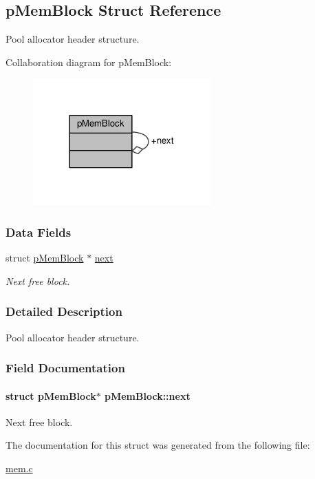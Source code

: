 \hypertarget{structpMemBlock}{\subsection{p\-Mem\-Block Struct Reference}
\label{structpMemBlock}
}


Pool allocator header structure.  




Collaboration diagram for p\-Mem\-Block\-:\nopagebreak
\begin{figure}[H]
\begin{center}
\leavevmode
\includegraphics[width=194pt]{structpMemBlock__coll__graph}
\end{center}
\end{figure}
\subsubsection*{Data Fields}
\begin{DoxyCompactItemize}
\item 
struct \hyperlink{structpMemBlock}{p\-Mem\-Block} $\ast$ \hyperlink{structpMemBlock_af04fa2bbd0fd3da6baf2ac08ce54455e}{next}
\begin{DoxyCompactList}\small\item\em Next free block. \end{DoxyCompactList}\end{DoxyCompactItemize}


\subsubsection{Detailed Description}
Pool allocator header structure. 

\subsubsection{Field Documentation}
\hypertarget{structpMemBlock_af04fa2bbd0fd3da6baf2ac08ce54455e}{
\paragraph[{next}]{\setlength{\rightskip}{0pt plus 5cm}struct {\bf p\-Mem\-Block}$\ast$ p\-Mem\-Block\-::next}}\label{structpMemBlock_af04fa2bbd0fd3da6baf2ac08ce54455e}


Next free block. 



The documentation for this struct was generated from the following file\-:\begin{DoxyCompactItemize}
\item 
\hyperlink{mem_8c}{mem.\-c}\end{DoxyCompactItemize}
